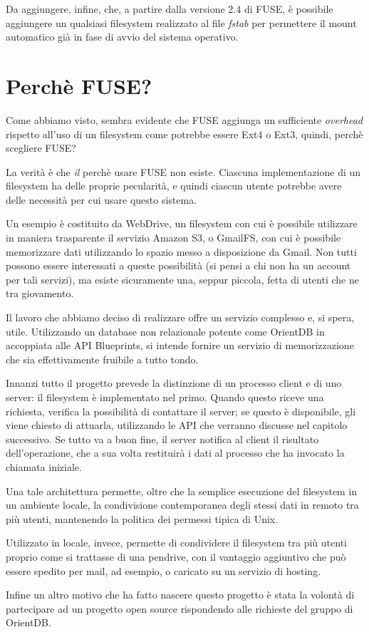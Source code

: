 Da aggiungere, infine, che, a partire dalla versione 2.4 di FUSE, è possibile aggiungere un qualsiasi filesystem realizzato al file \emph{fstab} per permettere il mount automatico già in fase di avvio del sistema operativo.

\section{Perchè FUSE?}
Come abbiamo visto, sembra evidente che FUSE aggiunga un sufficiente \emph{overhead} rispetto all'uso di un filesystem come potrebbe essere Ext4 o Ext3, quindi, perchè scegliere FUSE?

La verità è che \emph{il} perchè usare FUSE non esiste. Ciascuna implementazione di un filesystem ha delle proprie pecularità, e quindi ciascun utente potrebbe avere delle necessità per cui usare questo sistema.

Un esempio è costituito da WebDrive, un filesystem con cui è possibile utilizzare in maniera trasparente il servizio Amazon S3, o GmailFS, con cui è possibile memorizzare dati utilizzando lo spazio messo a disposizione da Gmail. Non tutti possono essere interessati a queste possibilità (si pensi a chi non ha un account per tali servizi), ma esiste sicuramente una, seppur piccola, fetta di utenti che ne tra giovamento.

Il lavoro che abbiamo deciso di realizzare offre un servizio complesso e, si spera, utile. Utilizzando un database non relazionale potente come OrientDB in accoppiata alle API Blueprints, si intende fornire un servizio di memorizzazione che sia effettivamente fruibile a tutto tondo.

Innanzi tutto il progetto prevede la distinzione di un processo client e di uno server: il filesystem è implementato nel primo. Quando questo riceve una richiesta, verifica la possibilità di contattare il server; se questo è disponibile, gli viene chiesto di attuarla, utilizzando le API che verranno discusse nel capitolo successivo. Se tutto va a buon fine, il server notifica al client il risultato dell'operazione, che a sua volta restituirà i dati al processo che ha invocato la chiamata iniziale.

Una tale architettura permette, oltre che la semplice esecuzione del filesystem in un ambiente locale, la condivisione contemporanea degli stessi dati in remoto tra più utenti, mantenendo la politica dei permessi tipica di Unix.

Utilizzato in locale, invece, permette di condividere il filesystem tra più utenti proprio come si trattasse di una pendrive, con il vantaggio aggiuntivo che può essere spedito per mail, ad esempio, o caricato su un servizio di hosting.

Infine un altro motivo che ha fatto nascere questo progetto è stata la volontà di partecipare ad un progetto open source rispondendo alle richieste del gruppo di OrientDB.

